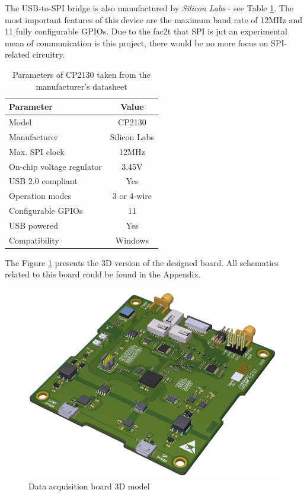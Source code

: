\documentclass[12pt,a4paper]{article}
\begin{document}
The USB-to-SPI bridge is also manufactured by \textit{Silicon Labs} - see Table \ref{tab:cp2130_params}. The  most important features of this device are the maximum baud rate of 12MHz and 11 fully configurable GPIOs. Due to the fac2t that SPI is jut an experimental mean of communication is this project, there would be no more focus on SPI-related circuitry.

\begin{table}[ht!]
\begin{tabular}{|l|c|}
\hline
\textbf{Parameter}	& \textbf{Value} 	\\ \hline
Model  				& CP2130       \\ \hline
Manufacturer    	& Silicon Labs	\\ \hline
Max. SPI clock       	&  12MHz 		\\ \hline
On-chip voltage regulator     &  3.45V			\\ \hline
USB 2.0 compliant        &  Yes			\\ \hline
Operation modes        &  3 or 4-wire			\\ \hline
Configurable GPIOs 		&  11		\\ \hline
USB powered 	&  Yes 		\\ \hline
Compatibility 	&  Windows 		\\ \hline
\end{tabular}
\caption{Parameters of CP2130 taken from the manufacturer's datasheet \cite{cp2130_params}}
\label{tab:cp2130_params}
\end{table}

The Figure \ref{fig:logger3d} presents the 3D version of the designed board. All schematics related to this board could be found in the Appendix.

\begin{figure}[ht!]
\includegraphics[scale=0.9]{logger.png}
\caption{Data acquisition board 3D model}
\label{fig:logger3d}
\end{figure}
\end{document}
